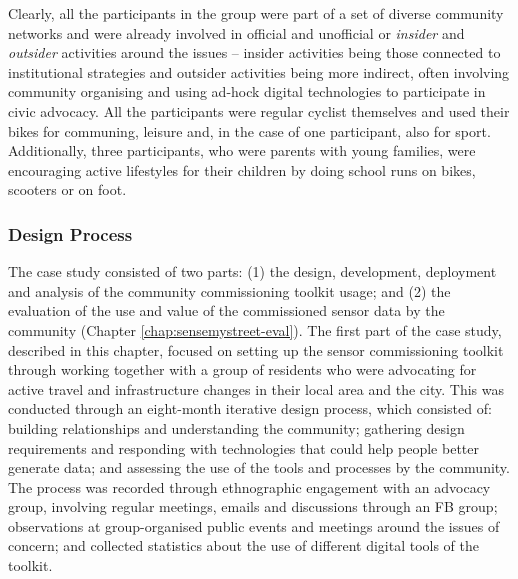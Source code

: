Clearly, all the participants in the group were part of a set of diverse community networks and were already involved in official and unofficial or \textit{insider} and \textit{outsider} activities \citep{asad_tap_2017} around the issues -- insider activities being those connected to institutional strategies and outsider activities being more indirect, often involving community organising and using ad-hock digital technologies to participate in civic advocacy. All the participants were regular cyclist themselves and used their bikes for communing, leisure and, in the case of one participant, also for sport. Additionally, three participants, who were parents with young families, were encouraging active lifestyles for their children by doing school runs on bikes, scooters or on foot.

\subsubsection{Design Process}
The case study consisted of two parts: (1) the design, development, deployment and analysis of the community commissioning toolkit usage; and (2) the evaluation of the use and value of the commissioned sensor data by the community (Chapter \ref{chap:sensemystreet-eval}). The first part of the case study, described in this chapter, focused on setting up the sensor commissioning toolkit through working together with a group of residents who were advocating for active travel and infrastructure changes in their local area and the city. This was conducted through an eight-month iterative design process, which consisted of: building relationships and understanding the community; gathering design requirements and responding with technologies that could help people better generate data; and assessing the use of the tools and processes by the community. The process was recorded through ethnographic engagement with an advocacy group, involving regular meetings, emails and discussions through an FB group; observations at group-organised public events and meetings around the issues of concern; and collected statistics about the use of different digital tools of the toolkit.


